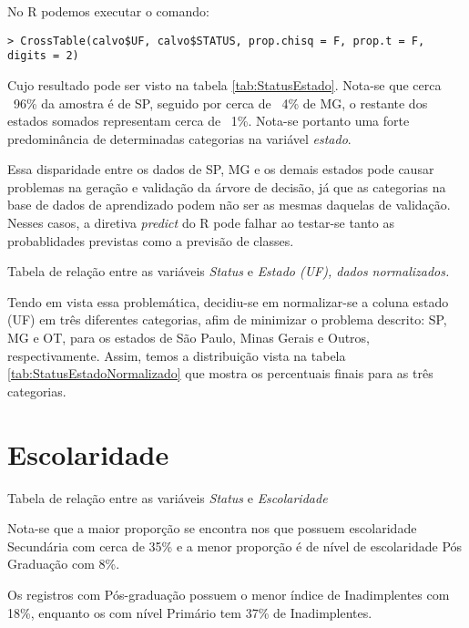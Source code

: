 No R podemos executar o comando:

\begin{verbatim}
> CrossTable(calvo$UF, calvo$STATUS, prop.chisq = F, prop.t = F, digits = 2)
\end{verbatim}

Cujo resultado pode ser visto na tabela \ref{tab:StatusEstado}. Nota-se que cerca ~96\% da amostra é de SP, 
seguido por cerca de ~4\% de MG, o restante dos estados somados representam cerca de ~1\%. Nota-se portanto uma 
forte predominância de determinadas categorias na variável \emph{estado}.

Essa disparidade entre os dados de SP, MG e os demais estados pode causar problemas na geração e validação da árvore de decisão, já que
as categorias na base de dados de aprendizado podem não ser as mesmas daquelas de validação. Nesses casos, a diretiva \emph{predict} do R pode falhar ao testar-se tanto as probablidades previstas como a previsão de classes. 

\begin{table}[h]
\centering

\caption{\label{tab:StatusEstadoNormalizado}Tabela de relação entre as variáveis \emph{Status} e \emph{Estado (UF), dados normalizados.}}
\end{table}

Tendo em vista essa problemática, decidiu-se em normalizar-se a coluna estado (UF) em três diferentes categorias, afim de minimizar o problema descrito: SP, MG e OT, para os estados de São Paulo, Minas Gerais e Outros, respectivamente. Assim, temos a distribuição vista na tabela \ref{tab:StatusEstadoNormalizado} que mostra os percentuais finais para as três categorias.

\clearpage

\section{Escolaridade}

\begin{table}[h]
\centering

\caption{\label{tab:StatusEscolaridade}Tabela de relação entre as variáveis \emph{Status
} e \emph{Escolaridade}}
\end{table}

Nota-se que a maior proporção se encontra nos que possuem escolaridade
Secundária com cerca de 35\% e a menor proporção é de nível de escolaridade
Pós Graduação com 8\%.

Os registros com Pós-graduação possuem o menor índice de Inadimplentes
com 18\%, enquanto os com nível Primário tem 37\% de Inadimplentes.


